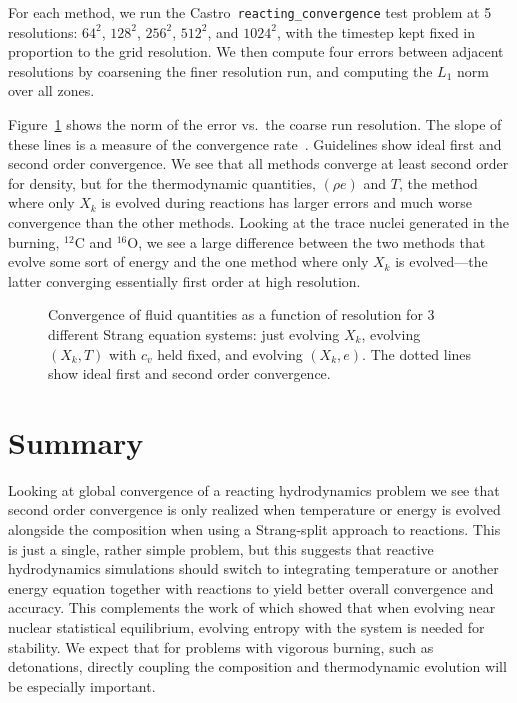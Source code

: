 \documentclass[times,preprint]{aastex63}
\newcommand{\castro}{{\sf Castro}}
\newcommand{\isotm}[2]{{}^{#2}\mathrm{#1}}
\begin{document}
For each method, we run the \castro\ {\tt reacting\_convergence} test
problem at 5 resolutions: $64^2$, $128^2$, $256^2$, $512^2$, and
$1024^2$, with the timestep kept fixed in proportion to the grid resolution.
We then compute four errors between adjacent resolutions by
coarsening the finer resolution run, and computing the $L_1$ norm over
all zones.  

Figure~\ref{thefigure} shows the norm of the error vs.\ the coarse run
resolution.  The slope of these lines is a measure of the convergence
rate~\citep{ORVV}.  Guidelines show ideal first and second order
convergence.  We see that all methods converge at least second order
for density, but for the thermodynamic quantities, $(\rho e)$ and $T$,
the method where only $X_k$ is evolved during reactions has larger
errors and much worse convergence than the other methods.  Looking at
the trace nuclei generated in the burning, $\isotm{C}{12}$ and
$\isotm{O}{16}$, we see a large difference between the two methods
that evolve some sort of energy and the one method where only $X_k$ is
evolved---the latter converging essentially first order at high
resolution.

\begin{figure}[t]
\centering
{}
\caption{\label{thefigure} Convergence of fluid quantities as a function of resolution
for 3 different Strang equation systems: just evolving $X_k$, evolving $(X_k, T)$ with $c_v$ held fixed, and evolving $(X_k, e)$. The dotted lines show ideal first and second order convergence.}
\end{figure}




\section{Summary}

Looking at global convergence of a reacting hydrodynamics problem we
see that second order convergence is only realized when temperature or
energy is evolved alongside the composition when using a Strang-split
approach to reactions.  This is just a single, rather simple problem,
but this suggests that reactive hydrodynamics simulations should
switch to integrating temperature or another energy equation together
with reactions to yield better overall convergence and accuracy.  This
complements the work of \citep{muller:1986} which showed that when
evolving near nuclear statistical equilibrium, evolving entropy
with the system is needed for stability.  We expect that for problems
with vigorous burning, such as detonations, directly coupling the composition
and thermodynamic evolution will be especially important.
\end{document}
